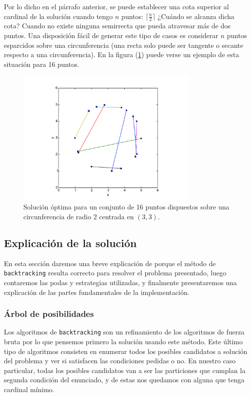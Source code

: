 Por lo dicho en el párrafo anterior, se puede establecer una cota superior al cardinal de la solución cuando tengo $n$ puntos: $\lceil\frac{n}{2}\rceil$ ¿Cuándo se alcanza dicha cota? Cuando no existe ninguna semirrecta que pueda atravesar más de dos puntos. Una disposición fácil de generar este tipo de casos es considerar $n$ puntos esparcidos sobre una circunferencia (una recta solo puede ser tangente o secante respecto a una circunferencia). En la figura (\ref{fig:ej3-5}) puede verse un ejemplo de esta situación para 16 puntos.

\begin{figure}[H]
  \centering
  \includegraphics[width=0.80\textwidth]{img/ejemplos/ej3-5.pdf}
  \caption{\footnotesize Solución óptima para un conjunto de 16 puntos dispuestos sobre una circunferencia de radio 2 centrada en $(3,3)$.}
  \label{fig:ej3-5}
\end{figure}

\subsection{Explicación de la solución}
En esta sección daremos una breve explicación de porque el método de \texttt{backtracking} resulta correcto para resolver el problema presentado,  luego contaremos las podas y estrategias utilizadas, y finalmente presentaremos una explicación de las partes fundamentales de la implementación. 

\subsubsection{Árbol de posibilidades}
Los algoritmos de \texttt{backtracking} son un refinamiento de los algoritmos de fuerza bruta por lo que pensemos primero la solución usando este método. Este último tipo de algoritmos consisten en enumerar todos los posibles candidatos a solución del problema y ver si satisfacen las condiciones pedidas o no. En nuestro caso particular, todas los posibles candidatos van a ser las particiones que cumplan la segunda condición del enunciado, y de estas nos quedamos con alguna que tenga cardinal mínimo. 


